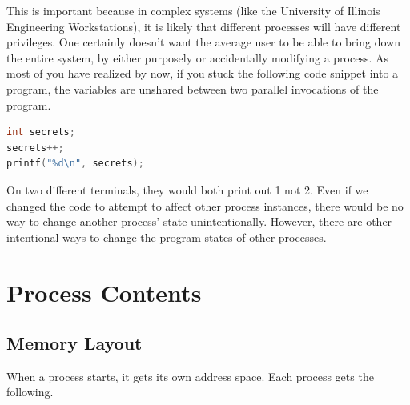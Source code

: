 This is important because in complex systems (like the University of Illinois Engineering Workstations), it is likely that different processes will have different privileges.
One certainly doesn't want the average user to be able to bring down the entire system, by either purposely or accidentally modifying a process.
As most of you have realized by now, if you stuck the following code snippet into a program, the variables are unshared between two parallel invocations of the program.

\begin{lstlisting}[language=C]
int secrets;
secrets++;
printf("%d\n", secrets);
\end{lstlisting}

On two different terminals, they would both print out 1 not 2.
Even if we changed the code to attempt to affect other process instances, there would be no way to change another process' state unintentionally.
However, there are other intentional ways to change the program states of other processes.

\section{Process Contents}

\subsection{Memory Layout}

When a process starts, it gets its own address space.
Each process gets the following.

